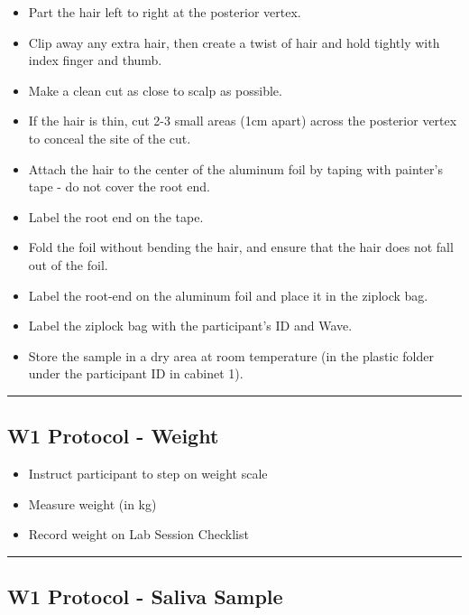 \documentclass[
]{book}
\providecommand{\tightlist}{%
  \setlength{\itemsep}{0pt}\setlength{\parskip}{0pt}}
\begin{document}
\begin{itemize}
\tightlist
\item
  Part the hair left to right at the posterior vertex.
\item
  Clip away any extra hair, then create a twist of hair and hold tightly with index finger and thumb.
\item
  Make a clean cut as close to scalp as possible.
\item
  If the hair is thin, cut 2-3 small areas (1cm apart) across the posterior vertex to conceal the site of the cut.
\item
  Attach the hair to the center of the aluminum foil by taping with painter's tape - do not cover the root end.
\item
  Label the root end on the tape.
\item
  Fold the foil without bending the hair, and ensure that the hair does not fall out of the foil.
\item
  Label the root-end on the aluminum foil and place it in the ziplock bag.
\item
  Label the ziplock bag with the participant's ID and Wave.
\item
  Store the sample in a dry area at room temperature (in the plastic folder under the participant ID in cabinet 1).
\end{itemize}

\begin{center}\rule{0.5\linewidth}{0.5pt}\end{center}

\hypertarget{w1-protocol---weight}{%
\subsection{W1 Protocol - Weight}\label{w1-protocol---weight}}

\begin{itemize}
\tightlist
\item
  Instruct participant to step on weight scale
\item
  Measure weight (in kg)
\item
  Record weight on Lab Session Checklist
\end{itemize}

\begin{center}\rule{0.5\linewidth}{0.5pt}\end{center}

\hypertarget{w1-protocol---saliva-sample}{%
\subsection{W1 Protocol - Saliva Sample}\label{w1-protocol---saliva-sample}}
\end{document}
